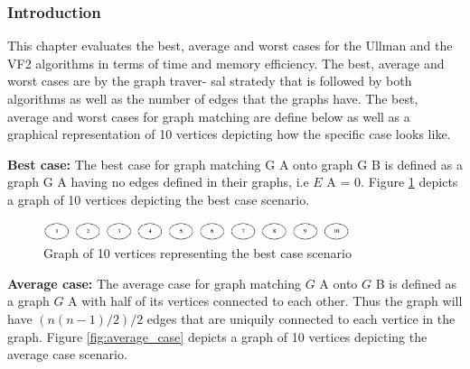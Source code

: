 
\subsubsection{Introduction}
This chapter evaluates the best, average and worst cases for the Ullman and the VF2 algorithms in
terms of time and memory efficiency. The best, average and worst cases are by the graph traver-
sal stratedy that is followed by both algorithms as well as the number of edges that the graphs have.\newline\newline
The best, average and worst cases for graph matching are define below as well as a graphical representation of 10 vertices 
depicting how the specific case looks like.

\textbf{Best case:} The best case for graph matching G A onto graph G B is defined as a graph G A having
no edges defined in their graphs, i.e $E$ {\tiny A} = 0. Figure \ref{fig:best_case} depicts a graph of 10 vertices depicting the
best case scenario.

\begin{figure}[H]
  \begin{center}
      \includegraphics[width=0.8\textwidth]{best.png}
  \end{center}    
  \caption{Graph of 10 vertices representing the best case scenario}
  \label{fig:best_case}
\end{figure}

\textbf{Average case:} The average case for graph matching $G$ {\tiny A} onto $G$ {\tiny B} is defined as a graph $G$ {\tiny A} with
half of its vertices connected to each other. Thus the graph will have $(n(n − 1)/2)/2$ edges that are uniquily connected to each vertice in 
the graph. Figure \ref{fig:average_case} depicts a graph of 10 vertices depicting the average case scenario.


